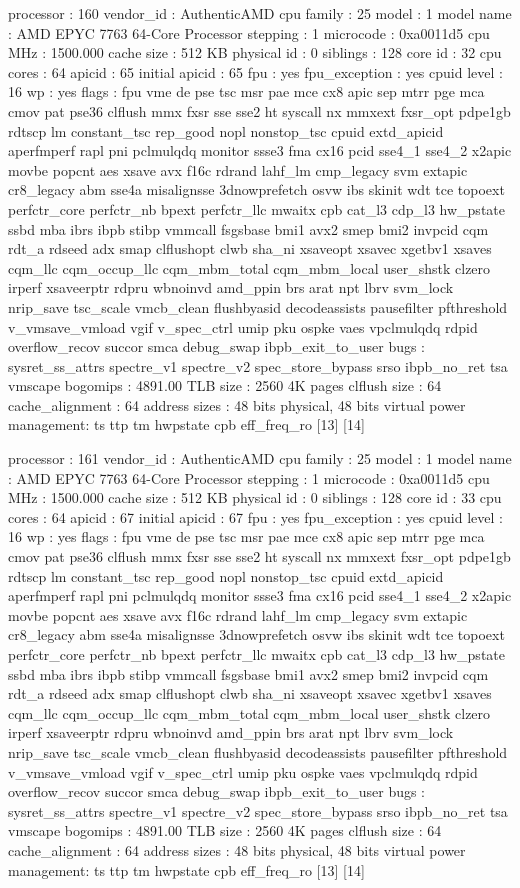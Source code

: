 processor	: 160
vendor_id	: AuthenticAMD
cpu family	: 25
model		: 1
model name	: AMD EPYC 7763 64-Core Processor
stepping	: 1
microcode	: 0xa0011d5
cpu MHz		: 1500.000
cache size	: 512 KB
physical id	: 0
siblings	: 128
core id		: 32
cpu cores	: 64
apicid		: 65
initial apicid	: 65
fpu		: yes
fpu_exception	: yes
cpuid level	: 16
wp		: yes
flags		: fpu vme de pse tsc msr pae mce cx8 apic sep mtrr pge mca cmov pat pse36 clflush mmx fxsr sse sse2 ht syscall nx mmxext fxsr_opt pdpe1gb rdtscp lm constant_tsc rep_good nopl nonstop_tsc cpuid extd_apicid aperfmperf rapl pni pclmulqdq monitor ssse3 fma cx16 pcid sse4_1 sse4_2 x2apic movbe popcnt aes xsave avx f16c rdrand lahf_lm cmp_legacy svm extapic cr8_legacy abm sse4a misalignsse 3dnowprefetch osvw ibs skinit wdt tce topoext perfctr_core perfctr_nb bpext perfctr_llc mwaitx cpb cat_l3 cdp_l3 hw_pstate ssbd mba ibrs ibpb stibp vmmcall fsgsbase bmi1 avx2 smep bmi2 invpcid cqm rdt_a rdseed adx smap clflushopt clwb sha_ni xsaveopt xsavec xgetbv1 xsaves cqm_llc cqm_occup_llc cqm_mbm_total cqm_mbm_local user_shstk clzero irperf xsaveerptr rdpru wbnoinvd amd_ppin brs arat npt lbrv svm_lock nrip_save tsc_scale vmcb_clean flushbyasid decodeassists pausefilter pfthreshold v_vmsave_vmload vgif v_spec_ctrl umip pku ospke vaes vpclmulqdq rdpid overflow_recov succor smca debug_swap ibpb_exit_to_user
bugs		: sysret_ss_attrs spectre_v1 spectre_v2 spec_store_bypass srso ibpb_no_ret tsa vmscape
bogomips	: 4891.00
TLB size	: 2560 4K pages
clflush size	: 64
cache_alignment	: 64
address sizes	: 48 bits physical, 48 bits virtual
power management: ts ttp tm hwpstate cpb eff_freq_ro [13] [14]

processor	: 161
vendor_id	: AuthenticAMD
cpu family	: 25
model		: 1
model name	: AMD EPYC 7763 64-Core Processor
stepping	: 1
microcode	: 0xa0011d5
cpu MHz		: 1500.000
cache size	: 512 KB
physical id	: 0
siblings	: 128
core id		: 33
cpu cores	: 64
apicid		: 67
initial apicid	: 67
fpu		: yes
fpu_exception	: yes
cpuid level	: 16
wp		: yes
flags		: fpu vme de pse tsc msr pae mce cx8 apic sep mtrr pge mca cmov pat pse36 clflush mmx fxsr sse sse2 ht syscall nx mmxext fxsr_opt pdpe1gb rdtscp lm constant_tsc rep_good nopl nonstop_tsc cpuid extd_apicid aperfmperf rapl pni pclmulqdq monitor ssse3 fma cx16 pcid sse4_1 sse4_2 x2apic movbe popcnt aes xsave avx f16c rdrand lahf_lm cmp_legacy svm extapic cr8_legacy abm sse4a misalignsse 3dnowprefetch osvw ibs skinit wdt tce topoext perfctr_core perfctr_nb bpext perfctr_llc mwaitx cpb cat_l3 cdp_l3 hw_pstate ssbd mba ibrs ibpb stibp vmmcall fsgsbase bmi1 avx2 smep bmi2 invpcid cqm rdt_a rdseed adx smap clflushopt clwb sha_ni xsaveopt xsavec xgetbv1 xsaves cqm_llc cqm_occup_llc cqm_mbm_total cqm_mbm_local user_shstk clzero irperf xsaveerptr rdpru wbnoinvd amd_ppin brs arat npt lbrv svm_lock nrip_save tsc_scale vmcb_clean flushbyasid decodeassists pausefilter pfthreshold v_vmsave_vmload vgif v_spec_ctrl umip pku ospke vaes vpclmulqdq rdpid overflow_recov succor smca debug_swap ibpb_exit_to_user
bugs		: sysret_ss_attrs spectre_v1 spectre_v2 spec_store_bypass srso ibpb_no_ret tsa vmscape
bogomips	: 4891.00
TLB size	: 2560 4K pages
clflush size	: 64
cache_alignment	: 64
address sizes	: 48 bits physical, 48 bits virtual
power management: ts ttp tm hwpstate cpb eff_freq_ro [13] [14]

